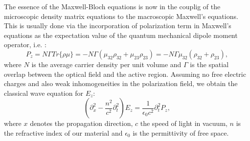 \documentclass[10pt,letterpaper]{article}
\begin{document}
The essence of the Maxwell-Bloch equations is now in the couplig of the microscopic density matrix equations to the macroscopic Maxwell's equations. This is usually done via the incorporation of  polarization term in Maxwell's equations as the expectation value of the quantum mechanical dipole moment operator, i.e. :
\begin{equation} 
P_z = N\Gamma Tr\{\rho \mu\} = -N\Gamma(\mu_{32}\rho_{32} + \mu_{23}\rho_{23}) =  -N\Gamma\mu_{32}(\rho_{32}+\rho_{23}) , \label{eq:fullpolarization}
\end{equation}
where $N$ is the average carrier density per unit volume and $\Gamma$ is the spatial overlap between the optical field  and the active region. Assuming no free electric charges and also weak inhomogeneities in the polarization field, we obtain the classical wave equation for  $E_z$:
\begin{equation}
(\partial^2_{x} -\frac{n^2}{c^2}\partial^2_t) E_z = \frac{1}{\epsilon_0 c^2}\partial^2_t P_z, 
\label{eq:fullwave}
\end{equation}
where $x$ denotes the propagation direction, $c$ the speed of light in vacuum, $n$ is the refractive index of our material and $\epsilon_0$ is the permittivity of free space.
\end{document}

